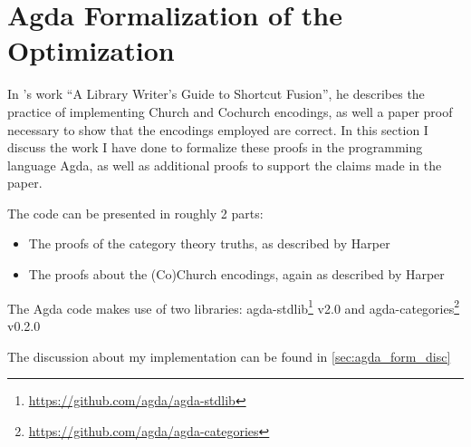 \section{Agda Formalization of the Optimization}\label{sec:formalization}
In \cite{Harper2011}'s work ``A Library Writer's Guide to Shortcut Fusion'', he describes the practice of implementing Church and Cochurch encodings, as well a paper proof necessary to show that the encodings employed are correct.
In this section I discuss the work I have done to formalize these proofs in the programming language Agda, as well as additional proofs to support the claims made in the paper.

The code can be presented in roughly 2 parts:
\begin{itemize}[noitemsep]
  \item The proofs of the category theory truths, as described by Harper
  \item The proofs about the (Co)Church encodings, again as described by Harper
\end{itemize}

The Agda code makes use of two libraries: agda-stdlib\footnote{\url{https://github.com/agda/agda-stdlib}} v2.0 and agda-categories\footnote{\url{https://github.com/agda/agda-categories}} v0.2.0


The discussion about my implementation can be found in \autoref{sec:agda_form_disc}




